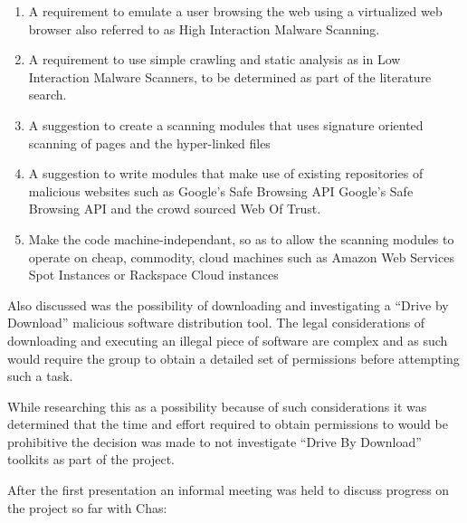 \begin{enumerate}
    \item A requirement to emulate a user browsing the web using a virtualized
            web browser also referred to as High Interaction Malware Scanning.

    \item A requirement to use simple crawling and static analysis as in Low
        Interaction Malware Scanners, to be determined as part of the literature
        search.

    \item A suggestion to create a scanning modules that uses signature oriented
        scanning of pages and the hyper-linked files

    \item A suggestion to write modules that make use of existing repositories
        of malicious websites such as Google's Safe Browsing
        API\cite{google-safe} Google's Safe Browsing API and the crowd sourced
        Web Of Trust.

    \item Make the code machine-independant, so as to allow the scanning modules
        to operate on cheap, commodity, cloud machines such as Amazon Web
        Services Spot Instances\cite{aws-spot} or Rackspace Cloud
        instances\cite{rackspace}
\end{enumerate}

Also discussed was the possibility of downloading and investigating a ``Drive by
Download'' malicious software distribution tool.  The legal considerations of
downloading and executing an illegal piece of software are complex and as such
would require the group to obtain a detailed set of permissions before
attempting such a task.

While researching this as a possibility because of such considerations it was
determined that the time and effort required to obtain permissions to would be
prohibitive the decision was made to not investigate ``Drive By Download''
toolkits as part of the project.

After the first presentation an informal meeting was held to discuss progress on
the project so far with Chas:


